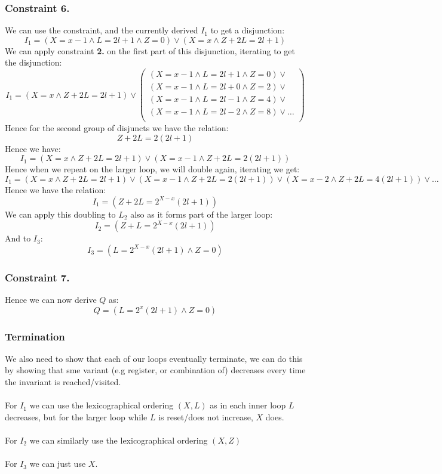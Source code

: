 \subsubsection*{Constraint 6.}
We can use the constraint, and the currently derived $I_1$ to get a disjunction:
\[I_1 = (X=x-1 \land L = 2l + 1 \land Z = 0) \lor (X = x \land Z + 2L = 2l + 1)\]
We can apply constraint \textbf{2.} on the first part of this disjunction, iterating to get the disjunction:
\[I_1 = (X = x \land Z + 2L = 2l + 1) \lor \left( \begin{matrix}
			(X=x-1 \land L = 2l + 1 \land Z = 0) \lor     \\
			(X=x-1 \land L = 2l + 0 \land Z = 2) \lor     \\
			(X=x-1 \land L = 2l-1 \land Z = 4) \lor       \\
			(X=x-1 \land L = 2l-2 \land Z = 8) \lor \dots \\
		\end{matrix} \right)\]
Hence for the second group of disjuncts we have the relation:
\[Z + 2L = 2(2l + 1)\]
Hence we have:
\[I_1 = (X = x \land Z + 2L = 2l + 1) \lor (X=x-1 \land Z + 2L = 2(2l + 1))\]
Hence when we repeat on the larger loop, we will double again, iterating we get:
\[I_1 = (X = x \land Z + 2L = 2l + 1) \lor (X=x-1 \land Z + 2L = 2(2l + 1)) \lor (X=x-2 \land Z + 2L = 4(2l + 1)) \lor \dots\]
Hence we have the relation:
\[I_1 = (Z + 2L = 2^{X - x}(2l + 1))\]
We can apply this doubling to $L_2$ also as it forms part of the larger loop:
\[I_2 = (Z + L = 2^{X - x}(2l + 1))\]
And to $I_3$:
\[I_3 = (L = 2^{X-x}(2l + 1) \land Z = 0)\]

\subsubsection*{Constraint 7.}
Hence we can now derive $Q$ as:
\[Q = (L = 2^x(2l + 1) \land Z = 0)\]

\subsubsection*{Termination}
We also need to show that each of our loops eventually terminate, we can do this by showing that sme variant (e.g register, or combination of) decreases every time the invariant is reached/visited.
\\
\\ For $I_1$ we can use the lexicographical ordering $(X,L)$ as in each inner loop $L$ decreases, but for the larger loop while $L$ is reset/does not increase, $X$ does.
\\
\\ For $I_2$ we can similarly use the lexicographical ordering $(X,Z)$
\\
\\ For $I_3$ we can just use $X$.


